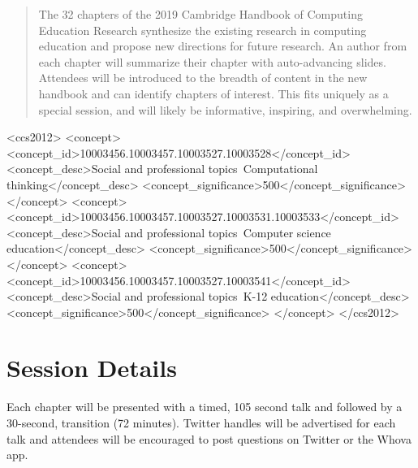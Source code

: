 \documentclass[sigconf]{acmart}
\begin{document}
%
\begin{abstract}
The 32 chapters of the 2019 Cambridge Handbook of Computing Education Research synthesize the existing research in computing education and propose new directions for future research. An author from each chapter will summarize their chapter with auto-advancing slides. Attendees will be introduced to the breadth of content in the new handbook and can identify chapters of interest. This fits uniquely as a special session, and will likely be informative, inspiring, and overwhelming. 
\end{abstract}

\begin{CCSXML}
<ccs2012>
<concept>
<concept_id>10003456.10003457.10003527.10003528</concept_id>
<concept_desc>Social and professional topics~Computational thinking</concept_desc>
<concept_significance>500</concept_significance>
</concept>
<concept>
<concept_id>10003456.10003457.10003527.10003531.10003533</concept_id>
<concept_desc>Social and professional topics~Computer science education</concept_desc>
<concept_significance>500</concept_significance>
</concept>
<concept>
<concept_id>10003456.10003457.10003527.10003541</concept_id>
<concept_desc>Social and professional topics~K-12 education</concept_desc>
<concept_significance>500</concept_significance>
</concept>
</ccs2012>
\end{CCSXML}


%
    
\maketitle

\section{Session Details} 
Each chapter \cite{ch00, ch01, ch02, ch03, ch04, ch05, ch06, ch08, ch09, ch10, ch11, ch12, ch13, ch14, ch15, ch16, ch17, ch18, ch19, ch20, ch21, ch22, ch23, ch24, ch25, ch26, ch27, ch28, ch29, ch30, ch31}  will be presented with a timed, 105 second talk and followed by a 30-second, transition (72 minutes). Twitter handles will be advertised for each talk and attendees will be encouraged to post questions on Twitter or the Whova app.  

\begin{comment}
\begin{acks}
Acknowledgement text.
\end{acks}
\end{comment}
%


\end{document}
